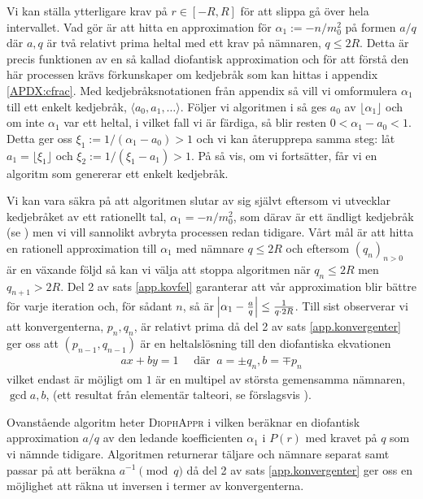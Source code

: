 Vi kan ställa ytterligare krav på \(r \in [-R, R]\) för att slippa gå över hela intervallet. Vad \cite{HaraldSieve} gör är att hitta en approximation för \(\alpha_1 := -n/m_0^2\) på formen \(a/q\) där $a,q$ är två relativt prima heltal med ett krav på nämnaren, $q \leq 2R$. Detta är precis funktionen av en så kallad diofantisk approximation och för att förstå den här processen krävs förkunskaper om kedjebråk som kan hittas i appendix \ref{APDX:cfrac}. Med kedjebråksnotationen från appendix så vill vi omformulera \(\alpha_1\) till ett enkelt kedjebråk, \(\langle a_0, a_1, \dots \rangle\). Följer vi algoritmen i \cite[Sats 21.5]{Lindahl} så ges \(a_0\) av \(\lfloor \alpha_1 \rfloor\) och om inte \(\alpha_1\) var ett heltal, i vilket fall vi är färdiga, så blir resten \(0 < \alpha_1 - a_0 < 1\). Detta ger oss \(\xi_1 := 1 / (\alpha_1 - a_0) > 1\) och vi kan återupprepa samma steg: låt \(a_1 = \lfloor \xi_1 \rfloor\) och \(\xi_2 := 1 / (\xi_1 - a_1) > 1\). På så vis, om vi fortsätter, får vi en algoritm som genererar ett enkelt kedjebråk. 

Vi kan vara säkra på att algoritmen slutar av sig självt eftersom vi utvecklar kedjebråket av ett rationellt tal, \(\alpha_1 = - n / m_0^2\), som därav är ett ändligt kedjebråk (se \cite[Sats 21.5]{Lindahl}) men vi vill sannolikt avbryta processen redan tidigare. Vårt mål är att hitta en rationell approximation till \(\alpha_1\) med nämnare \(q \leq 2R\) och eftersom \((q_n)_{n>0}\) är en växande följd så kan vi välja att stoppa algoritmen när \(q_n \leq 2 R\) men \(q_{n + 1} > 2R\). Del 2 av sats \ref{app.kovfel} garanterar att vår approximation blir bättre för varje iteration och, för sådant $n$, så är \(\abs{\alpha_1 - \frac{a}{q}} \leq \frac{1}{q \cdot 2R}\). Till sist observerar vi att konvergenterna, \(p_n, q_n\), är relativt prima då del 2 av sats \ref{app.konvergenter} ger oss att \((p_{n-1}, q_{n-1})\) är en heltalslösning till den diofantiska ekvationen
\begin{align*}
    a x + b y = 1 \quad \text{ där }\ a = \pm q_n, b = \mp p_n
\end{align*}
vilket endast är möjligt om \(1\) är en multipel av största gemensamma nämnaren, \(\gcd{a,b}\), (ett resultat från elementär talteori, se förslagsvis \cite[Sats 3.1]{Lindahl}). %

Ovanstående algoritm heter \textsc{DiophAppr} i \cite{HaraldSieve} vilken beräknar en diofantisk approximation \(a / q\) av den ledande koefficienten \(\alpha_1\) i \(P(r)\) med kravet på $q$ som vi nämnde tidigare. Algoritmen returnerar täljare och nämnare separat samt passar på att beräkna \(a^{-1} \pmod{q}\) då del 2 av sats \ref{app.konvergenter} ger oss en möjlighet att räkna ut inversen i termer av konvergenterna. 

